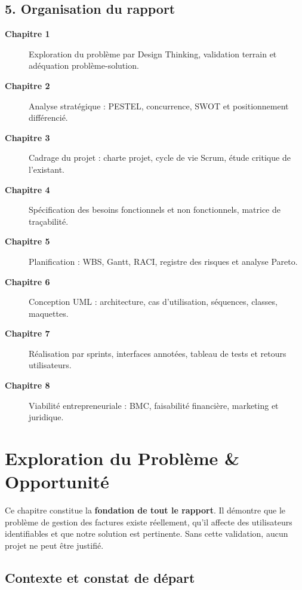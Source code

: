\documentclass[12pt,a4paper]{report}
\begin{document}
\section*{5. Organisation du rapport}

\begin{description}
    \item[\textbf{Chapitre 1}] Exploration du problème par Design Thinking, validation terrain et adéquation problème-solution.
    \item[\textbf{Chapitre 2}] Analyse stratégique : PESTEL, concurrence, SWOT et positionnement différencié.
    \item[\textbf{Chapitre 3}] Cadrage du projet : charte projet, cycle de vie Scrum, étude critique de l'existant.
    \item[\textbf{Chapitre 4}] Spécification des besoins fonctionnels et non fonctionnels, matrice de traçabilité.
    \item[\textbf{Chapitre 5}] Planification : WBS, Gantt, RACI, registre des risques et analyse Pareto.
    \item[\textbf{Chapitre 6}] Conception UML : architecture, cas d'utilisation, séquences, classes, maquettes.
    \item[\textbf{Chapitre 7}] Réalisation par sprints, interfaces annotées, tableau de tests et retours utilisateurs.
    \item[\textbf{Chapitre 8}] Viabilité entrepreneuriale : BMC, faisabilité financière, marketing et juridique.
\end{description}

\chapter{Exploration du Problème \& Opportunité}

Ce chapitre constitue la \textbf{fondation de tout le rapport}. Il démontre que le problème de gestion des factures existe réellement, qu'il affecte des utilisateurs identifiables et que notre solution est pertinente. Sans cette validation, aucun projet ne peut être justifié.

\section{Contexte et constat de départ}
\end{document}
